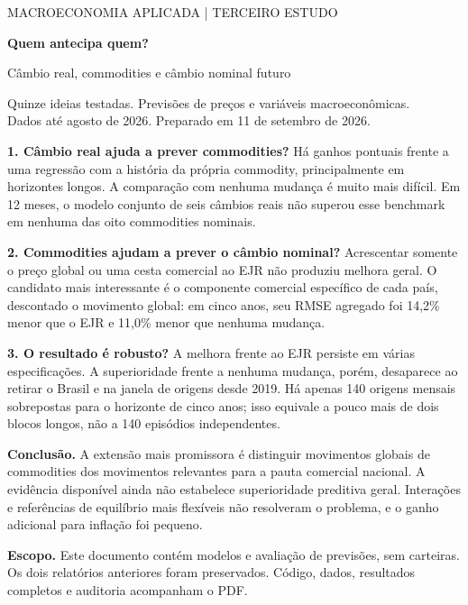 \documentclass[11pt,a4paper]{article}
\begin{document}
\thispagestyle{empty}
{\large\color{navy}MACROECONOMIA APLICADA \quad | \quad TERCEIRO ESTUDO}
\vspace{1cm}

{\Huge\bfseries\color{navy}Quem antecipa quem?}
\vspace{.4cm}

{\Large Câmbio real, commodities e câmbio nominal futuro}
\vspace{.5cm}

Quinze ideias testadas. Previsões de preços e variáveis macroeconômicas.\\
Dados até agosto de 2026. Preparado em 11 de setembro de 2026.
\vspace{.5cm}

\textbf{1. Câmbio real ajuda a prever commodities?} Há ganhos pontuais frente a uma regressão com a história da própria commodity, principalmente em horizontes longos. A comparação com nenhuma mudança é muito mais difícil. Em 12 meses, o modelo conjunto de seis câmbios reais não superou esse benchmark em nenhuma das oito commodities nominais.

\textbf{2. Commodities ajudam a prever o câmbio nominal?} Acrescentar somente o preço global ou uma cesta comercial ao EJR não produziu melhora geral. O candidato mais interessante é o componente comercial específico de cada país, descontado o movimento global: em cinco anos, seu RMSE agregado foi 14,2\% menor que o EJR e 11,0\% menor que nenhuma mudança.

\textbf{3. O resultado é robusto?} A melhora frente ao EJR persiste em várias especificações. A superioridade frente a nenhuma mudança, porém, desaparece ao retirar o Brasil e na janela de origens desde 2019. Há apenas 140 origens mensais sobrepostas para o horizonte de cinco anos; isso equivale a pouco mais de dois blocos longos, não a 140 episódios independentes.

\textbf{Conclusão.} A extensão mais promissora é distinguir movimentos globais de commodities dos movimentos relevantes para a pauta comercial nacional. A evidência disponível ainda não estabelece superioridade preditiva geral. Interações e referências de equilíbrio mais flexíveis não resolveram o problema, e o ganho adicional para inflação foi pequeno.

\vfill
\colorbox{light}{\parbox{.94\linewidth}{\textbf{Escopo.} Este documento contém modelos e avaliação de previsões, sem carteiras. Os dois relatórios anteriores foram preservados. Código, dados, resultados completos e auditoria acompanham o PDF.}}
\end{document}
